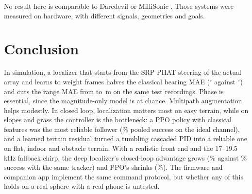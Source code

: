 No result here is comparable to Daredevil \cite{constandache2014daredevil} or MilliSonic
\cite{wang2019millisonic}. Those systems were measured on hardware, with different signals,
geometries and goals.

\section{Conclusion}

In simulation, a localizer that starts from the SRP-PHAT steering of the actual array and
learns to weight frames halves the classical bearing MAE (\LocdlfullBMAE$^\circ$ against
\LocsrpphatBMAE$^\circ$) and cuts the range MAE from \LocsrpphatRMAE{} to \LocdlfullRMAE\,m on
the same \NTestSet{} test recordings. Phase is essential, since the magnitude-only model is at
chance. Multipath augmentation helps modestly. In closed loop, localization matters most on
easy terrain, while on slopes and grass the controller is the bottleneck: a PPO policy with
classical features was the most reliable follower (\CLAusrlsucc\% pooled success on the ideal
channel), and a learned terrain residual turned a tumbling cascaded PID into a reliable one on
flat, indoor and obstacle terrain. With a realistic front end and the 17--19.5\,kHz fallback
chirp, the deep localizer's closed-loop advantage grows (\CLBfbdltracksucc\% against
\CLBfbgcctracksucc\% success with the same tracker) and PPO's shrinks (\CLBfbrlsucc\%). The firmware and companion app implement the same command
protocol, but whether any of this holds on a real sphere with a real phone is untested.
